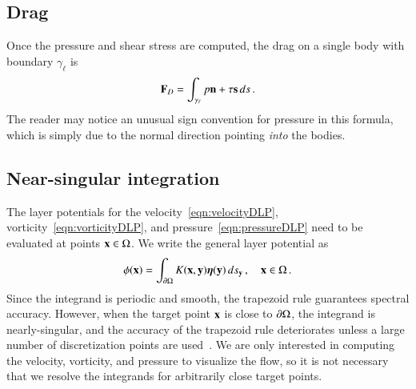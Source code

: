 \documentclass[preprint, 10pt]{elsarticle}
\begin{document}
\subsection{Drag}
\label{sec:drag}
Once the pressure and shear stress are computed, the drag on a single body with boundary $\gamma_\ell$ is
\begin{align}
\mathbf{F}_{D} = \int_{\gamma_\ell} p {\mathbf{n}} + \tau {\mathbf{s}} \,ds\, .
\label{eqn:drag}
\end{align}
The reader may notice an unusual sign convention for pressure in this formula, which is simply due to the normal direction pointing {\em into} the bodies.

\subsection{Near-singular integration}
\label{sec:NSI}
The layer potentials for the velocity~\eqref{eqn:velocityDLP}, vorticity~\eqref{eqn:vorticityDLP}, and pressure~\eqref{eqn:pressureDLP} need to be evaluated at points ${\mathbf{x}} \in \Omega$. We write the general layer potential as
\begin{align}
  \phi({\mathbf{x}}) = \int_{{\partial}\Omega} K({\mathbf{x}},{\mathbf{y}}) {\boldsymbol\eta}({\mathbf{y}}) \, ds_{\mathbf{y}}\,, \quad {\mathbf{x}} \in \Omega\, .
  \label{eqn:genericLP}
\end{align}
Since the integrand is periodic and smooth, the trapezoid rule guarantees spectral accuracy.  However, when the target point ${\mathbf{x}}$ is close to ${\partial}\Omega$, the integrand is nearly-singular, and the accuracy of the trapezoid rule deteriorates unless a large number of discretization points are used~\cite{bar2014}.  We are only interested in computing the velocity, vorticity, and pressure to visualize the flow, so it is not necessary that we resolve the integrands for arbitrarily close target points.
\end{document}
